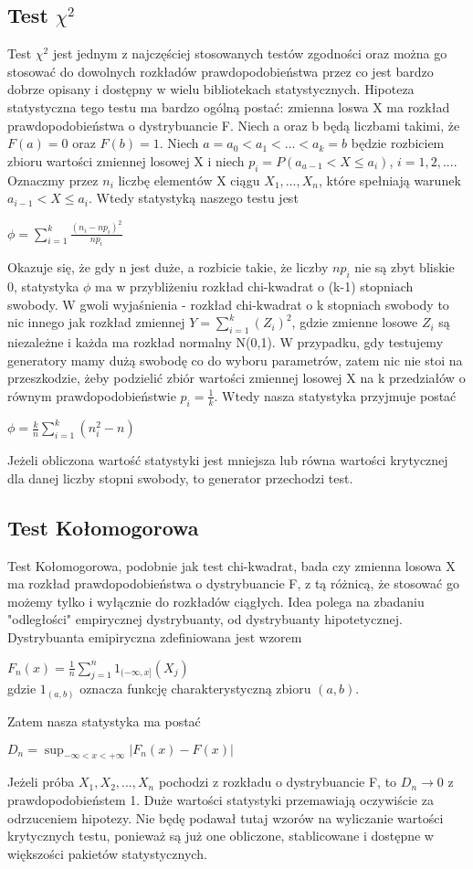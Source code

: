 \documentclass[a4paper]{scrartcl}
\begin{document}
\subsection{Test $\chi^{2}$}
\qquad Test $\chi^2$ jest jednym z najczęściej stosowanych testów zgodności oraz można go stosować do dowolnych rozkładów prawdopodobieństwa przez co jest bardzo dobrze opisany i dostępny w wielu bibliotekach statystycznych. Hipoteza statystyczna tego testu ma bardzo ogólną postać: zmienna loswa X ma rozkład prawdopodobieństwa o dystrybuancie F. Niech a oraz b będą liczbami takimi, że $F(a)=0$ oraz $F(b)=1$. Niech $a=a_0<a_1<...<a_k=b$ będzie rozbiciem zbioru wartości zmiennej losowej X i niech $p_i=P(a_{a-1}<X\leq a_i)$, $i=1,2,...$. Oznaczmy przez $n_i$ liczbę elementów X ciągu $X_1,...,X_n$, które spełniają warunek $a_{i-1} < X \leq a_i$. Wtedy statystyką naszego testu jest 
\begin{center}
$\phi = \sum_{i=1}^k\frac{(n_i - np_i)^2}{np_i}$
\end{center}
Okazuje się, że gdy n jest duże, a rozbicie takie, że liczby $np_i$ nie są zbyt bliskie 0, statystyka $\phi$ ma w przybliżeniu rozkład chi-kwadrat o (k-1) stopniach swobody. W gwoli wyjaśnienia - rozkład chi-kwadrat o k stopniach swobody to nic innego jak rozkład zmiennej $Y=\sum_{i=1}^k(Z_i)^2$, gdzie zmienne losowe $Z_i$ są niezależne i każda ma rozkład normalny N(0,1). W przypadku, gdy testujemy generatory mamy dużą swobodę co do wyboru parametrów, zatem nic nie stoi na przeszkodzie, żeby podzielić zbiór wartości zmiennej losowej X na k przedziałów o równym prawdopodobieństwie $p_i=\frac{1}{k}$. Wtedy nasza statystyka przyjmuje postać
\begin{center}
$\phi = \frac{k}{n}\sum_{i=1}^k(n_i^2 - n)$
\end{center}
Jeżeli obliczona wartość statystyki jest mniejsza lub równa wartości krytycznej dla danej liczby stopni swobody, to generator przechodzi test.
\subsection{Test Kołomogorowa}
\qquad Test Kołomogorowa, podobnie jak test chi-kwadrat, bada czy zmienna losowa X ma rozkład prawdopodobieństwa o dystrybuancie F, z tą różnicą, że stosować go możemy tylko i wyłącznie do rozkładów ciągłych. Idea polega na zbadaniu "odległości" empirycznej dystrybuanty, od dystrybuanty hipotetycznej. Dystrybuanta emipiryczna zdefiniowana jest wzorem
\begin{center}
$F_n(x)=\frac{1}{n}\sum_{j=1}^n1_{(-\infty, x]}(X_j)$\\gdzie $1_{(a,b)}$ oznacza funkcję charakterystyczną zbioru $(a,b)$.
\end{center}
Zatem nasza statystyka ma postać
\begin{center}
$D_n=\sup_{-\infty < x < +\infty} |F_n(x) - F(x)|$
\end{center}
Jeżeli próba $X_1, X_2,...,X_n$ pochodzi z rozkładu o dystrybuancie F, to $D_n \to 0$ z prawdopodobieństem 1. Duże wartości statystyki przemawiają oczywiście za odrzuceniem hipotezy. Nie będę podawał tutaj wzorów na wyliczanie wartości krytycznych testu, ponieważ są już one obliczone, stablicowane i dostępne w większości pakietów statystycznych. 
\end{document}

